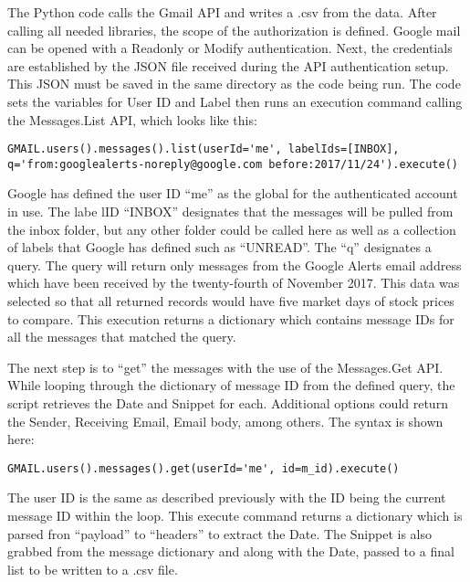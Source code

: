 \documentclass[sigconf]{acmart}
\begin{document}
The Python code calls the Gmail API and writes a .csv from the data. After calling all needed libraries, the scope of the authorization is defined. Google mail can be opened with a Readonly or Modify authentication. Next, the credentials are established by the JSON file received during the API authentication setup. This JSON must be saved in the same directory as the code being run. The code sets the variables for User ID and Label then runs an execution command calling the  Messages.List API, which looks like this:
\begin{mdframed}[style=default]
\begin{lstlisting}
GMAIL.users().messages().list(userId='me', labelIds=[INBOX], q='from:googlealerts-noreply@google.com before:2017/11/24').execute()
\end{lstlisting}
\end{mdframed}
Google has defined the user ID ``me'' as the global for the authenticated account in use. The labe lID ``INBOX'' designates that the messages will be pulled from the inbox folder, but any other folder could be called here as well as a collection of labels that Google has defined such as ``UNREAD''. The ``q'' designates a query. The query will return only messages from the Google Alerts email address which have been received by the twenty-fourth of November 2017. This data was selected so that all returned records would have five market days of stock prices to compare. This execution returns a dictionary which contains message IDs for all the messages that matched the query.

The next step is to ``get'' the messages with the use of the Messages.Get API. While looping through the dictionary of message ID from the defined query, the script retrieves the Date and Snippet for each. Additional options could return the Sender, Receiving Email, Email body, among others. The syntax is shown here:
\begin{mdframed}[style=default]
\begin{lstlisting}
GMAIL.users().messages().get(userId='me', id=m_id).execute()
\end{lstlisting}
\end{mdframed}
The user ID is the same as described previously with the ID being the current message ID within the loop. This execute command returns a dictionary which is parsed fron ``payload'' to ``headers'' to extract the Date. The Snippet is also grabbed from the message dictionary and along with the Date, passed to a final list to be written to a .csv file. 
\end{document}
